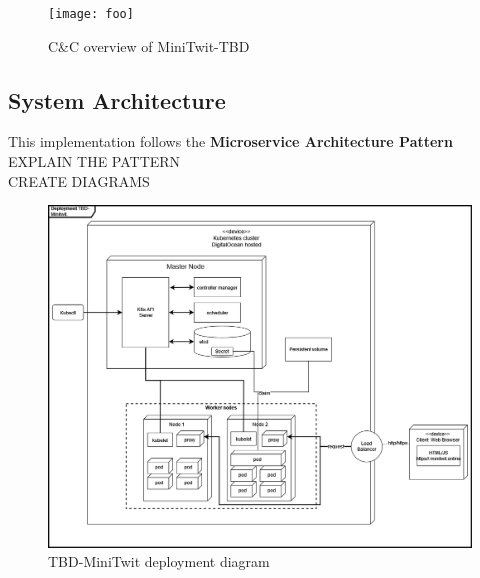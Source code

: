 \begin {figure}[H]
    \centering
    \texttt{[image: foo]}
    \caption{C&C overview of MiniTwit-TBD}
    \label{fig:legacyDeploy}
\end{figure}


\subsection{System Architecture}
\label{subsec:system_architecture}
This implementation follows the \textbf{Microservice Architecture Pattern} \\
EXPLAIN THE PATTERN \\
CREATE DIAGRAMS \\
\begin {figure}[H]
    \centering
    \includegraphics[scale=0.45]{images/DevopsDiagrams-Deployment k8s.drawio.png}
    \caption{TBD-MiniTwit deployment diagram}
    \label{fig:figDeploy}
\end{figure}
